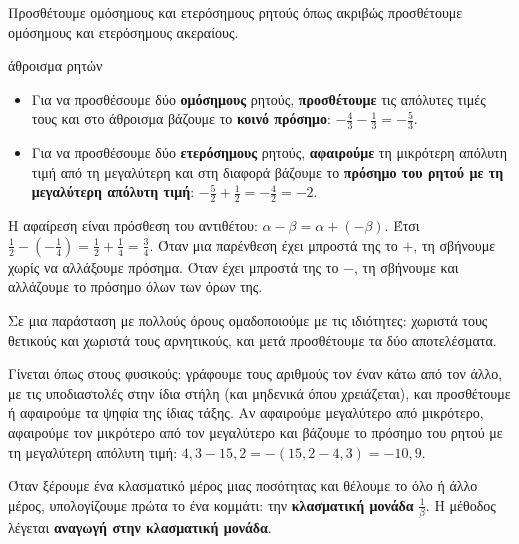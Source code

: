 
Προσθέτουμε ομόσημους και ετερόσημους ρητούς όπως ακριβώς προσθέτουμε ομόσημους και ετερόσημους ακεραίους.

\begin{kanonas}{άθροισμα ρητών}
\begin{itemize}[leftmargin=1.2em,itemsep=0.3ex,topsep=2pt]
\item Για να προσθέσουμε δύο \textbf{ομόσημους} ρητούς, \textbf{προσθέτουμε} τις απόλυτες τιμές τους και στο άθροισμα βάζουμε το \textbf{κοινό πρόσημο}: $-\frac{4}{3}-\frac{1}{3}=-\frac{5}{3}$.
\item Για να προσθέσουμε δύο \textbf{ετερόσημους} ρητούς, \textbf{αφαιρούμε} τη μικρότερη απόλυτη τιμή από τη μεγαλύτερη και στη διαφορά βάζουμε το \textbf{πρόσημο του ρητού με τη μεγαλύτερη απόλυτη τιμή}: $-\frac{5}{2}+\frac{1}{2}=-\frac{4}{2}=-2$.
\end{itemize}
\end{kanonas}


Η αφαίρεση είναι πρόσθεση του αντιθέτου: $\alpha-\beta=\alpha+(-\beta)$. Έτσι $\frac{1}{2}-\left(-\frac{1}{4}\right)=\frac{1}{2}+\frac{1}{4}=\frac{3}{4}$. Όταν μια παρένθεση έχει μπροστά της το $+$, τη σβήνουμε χωρίς να αλλάξουμε πρόσημα. Όταν έχει μπροστά της το $-$, τη σβήνουμε και αλλάζουμε το πρόσημο όλων των όρων της.

Σε μια παράσταση με πολλούς όρους ομαδοποιούμε με τις ιδιότητες: χωριστά τους θετικούς και χωριστά τους αρνητικούς, και μετά προσθέτουμε τα δύο αποτελέσματα.


Γίνεται όπως στους φυσικούς: γράφουμε τους αριθμούς τον έναν κάτω από τον άλλο, με τις υποδιαστολές στην ίδια στήλη (και μηδενικά όπου χρειάζεται), και προσθέτουμε ή αφαιρούμε τα ψηφία της ίδιας τάξης. Αν αφαιρούμε μεγαλύτερο από μικρότερο, αφαιρούμε τον μικρότερο από τον μεγαλύτερο και βάζουμε το πρόσημο του ρητού με τη μεγαλύτερη απόλυτη τιμή: $4{,}3-15{,}2=-(15{,}2-4{,}3)=-10{,}9$.


Όταν ξέρουμε ένα κλασματικό μέρος μιας ποσότητας και θέλουμε το όλο ή άλλο μέρος, υπολογίζουμε πρώτα το ένα κομμάτι: την \textbf{κλασματική μονάδα} $\frac{1}{\beta}$. Η μέθοδος λέγεται \textbf{αναγωγή στην κλασματική μονάδα}.

